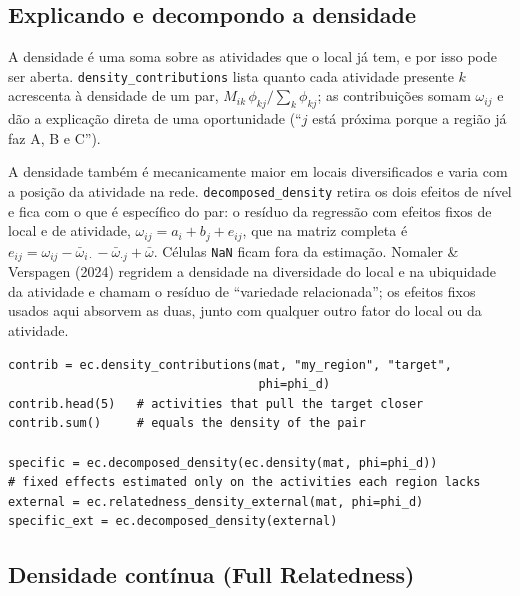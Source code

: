 \documentclass[12pt, a4paper]{article}
\newcommand{\fn}[1]{\texttt{#1}}
\begin{document}
\subsection{Explicando e decompondo a densidade}

\begin{sloppypar}
A densidade \'{e} uma soma sobre as atividades que o local j\'{a} tem, e
por isso pode ser aberta. \fn{density\_contributions} lista quanto cada
atividade presente $k$ acrescenta \`{a} densidade de um par,
$M_{ik}\,\phi_{kj} / \sum_k \phi_{kj}$; as contribui\c{c}\~{o}es somam
$\omega_{ij}$ e d\~{a}o a explica\c{c}\~{a}o direta de uma oportunidade
(``$j$ est\'{a} pr\'{o}xima porque a regi\~{a}o j\'{a} faz A, B e C'').
\end{sloppypar}

A densidade tamb\'{e}m \'{e} mecanicamente maior em locais diversificados
e varia com a posi\c{c}\~{a}o da atividade na rede.
\fn{decomposed\_density} retira os dois efeitos de n\'{i}vel e fica com o
que \'{e} espec\'{i}fico do par: o res\'{i}duo da regress\~{a}o com
efeitos fixos de local e de atividade,
$\omega_{ij} = a_i + b_j + e_{ij}$, que na matriz completa \'{e}
$e_{ij} = \omega_{ij} - \bar\omega_{i\cdot} - \bar\omega_{\cdot j} +
\bar\omega$. C\'{e}lulas \texttt{NaN} ficam fora da estima\c{c}\~{a}o.
Nomaler \& Verspagen (2024) regridem a densidade na diversidade do local
e na ubiquidade da atividade e chamam o res\'{i}duo de ``variedade
relacionada''; os efeitos fixos usados aqui absorvem as duas, junto com
qualquer outro fator do local ou da atividade.

\begin{lstlisting}[caption={Contribui\c{c}\~{o}es para a densidade e densidade l\'{i}quida de efeitos fixos}]
contrib = ec.density_contributions(mat, "my_region", "target",
                                   phi=phi_d)
contrib.head(5)   # activities that pull the target closer
contrib.sum()     # equals the density of the pair

specific = ec.decomposed_density(ec.density(mat, phi=phi_d))
# fixed effects estimated only on the activities each region lacks
external = ec.relatedness_density_external(mat, phi=phi_d)
specific_ext = ec.decomposed_density(external)
\end{lstlisting}

\subsection{Densidade cont\'{i}nua (Full Relatedness)}
\end{document}
